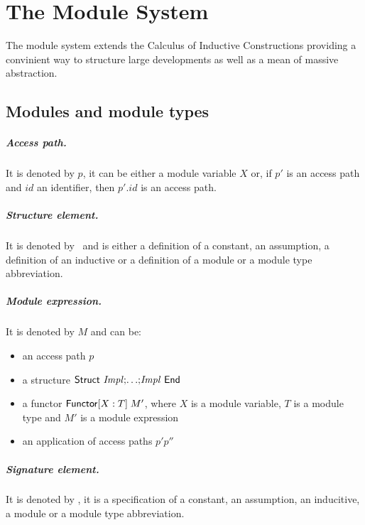 \chapter{The Module System}
\label{Mod}

The module system extends the Calculus of Inductive Constructions
providing a convinient way to structure large developments as well as
a mean of massive abstraction.

\section{Modules and module types}

\paragraph{Access path.} It is denoted by $p$, it can be either a module 
variable $X$ or, if $p'$ is an access path and $id$ an identifier, then
$p'.id$ is an access path.

\paragraph{Structure element.} It is denoted by \Impl\ and is either a
definition of a constant, an assumption, a definition of an inductive
or a definition of a module or a module type abbreviation.

\paragraph{Module expression.} It is denoted by $M$ and can be:
\begin{itemize}
\item an access path $p$
\item a structure ${\sf Struct}~{{\it Impl}} {\tt ;} {\ldots} {\tt ;} {{\it Impl}}~{\sf End}$
\item a functor ${\sf Functor}[X:T]\;M'$, where $X$ is a module variable,
  $T$ is a module type and $M'$ is a module expression
\item an application of access paths $p' p''$
\end{itemize}

\paragraph{Signature element.} It is denoted by \Spec, it is a
specification of a constant, an assumption, an inducitive, a module or
a module type abbreviation.

